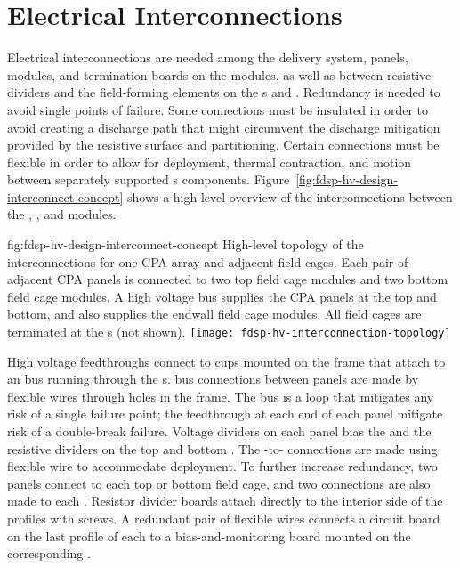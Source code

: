 \section{Electrical Interconnections} %
\label{sec:fdsp-hv-design-interconnect}

Electrical interconnections are needed among the  delivery system,  panels,  modules, and termination
boards on the  modules, as well as between resistive dividers and
the field-forming elements on the s and .  
Redundancy is
needed to avoid single points of failure. 
Some connections must be
insulated in order to avoid creating a discharge path that might
circumvent the discharge mitigation provided by the resistive 
surface and  partitioning.  Certain connections must be
flexible in order to allow for  deployment, thermal
contraction, and motion between separately supported s components.  Figure~\ref{fig:fdsp-hv-design-interconnect-concept} shows a high-level
overview of the interconnections between the , , and  modules.

\begin{dunefigure}{fig:fdsp-hv-design-interconnect-concept}
  {High-level topology of the  interconnections for one CPA array and adjacent field cages. Each pair of adjacent CPA panels is connected to two top field cage modules and two bottom field cage modules. A high voltage bus supplies the CPA panels at the top and bottom, and also supplies the endwall field cage modules. All field cages are terminated at the s (not shown).}
  \texttt{[image: fdsp-hv-interconnection-topology]}
\end{dunefigure}

High voltage feedthroughs connect to cups mounted on the  frame
that attach to an  bus running through the s.   bus connections
between  panels are made by flexible wires through holes in the
 frame. The  bus is a loop that mitigates any risk of a single
failure point; the feedthrough at each end of each  panel mitigate
risk of a double-break failure.  Voltage dividers on each  panel
bias the  and the resistive dividers on the top
and bottom .  The -to- connections are made using
flexible wire to accommodate  deployment.  To further
increase redundancy, two  panels connect to each top or bottom
field cage, and two connections are also made to each . Resistor divider boards attach directly to the interior side of
the  profiles with screws.   A redundant pair of flexible wires
connects a circuit board on the last profile of each  to a
bias-and-monitoring board mounted on the corresponding .

